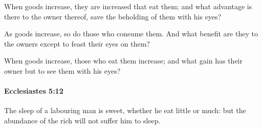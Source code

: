 			\begin{versebox}
					\item[BHS] 
					\item[LXX] 
					\item[ASV] When goods increase, they are increased that eat them; and what advantage is there to the owner thereof, save the beholding of them with his eyes?
					\item[NIV] As goods increase, so do those who consume them. And what benefit are they to the owners except to feast their eyes on them?
					\item[NRSV] When goods increase, those who eat them increase; and what gain has their owner but to see them with his eyes?
			\end{versebox}

		\paragraph{Ecclesiastes 5:12} %
			\label{ECCLESIASTES-5-12}

			The sleep of a labouring man is sweet, whether he eat little or much: but the abundance of the rich will not suffer him to sleep.

